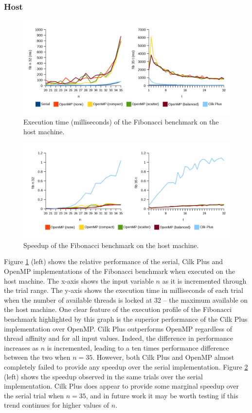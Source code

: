 \documentclass{report}
\begin{document}
\subsubsection{Host}
\noindent
\begin{figure}[b!]
	\includegraphics[width=\linewidth]{../../charts/intel64/fib_time}
	\caption{Execution time (milliseconds) of the Fibonacci benchmark on the host machine.}
	\label{Fig:fibhosttime}
\end{figure}
\noindent
\begin{figure}[h!]
	\includegraphics[width=\linewidth]{../../charts/intel64/fib_speedup}
	\caption{Speedup of the Fibonacci benchmark on the host machine.}
	\label{Fig:fibhostspeedup}
\end{figure}
Figure \ref{Fig:fibhosttime} (left) shows the relative performance of the serial, Cilk Plus and OpenMP implementations of the Fibonacci benchmark when executed on the host machine. The x-axis shows the input variable \(n\) as it is incremented through the trial range. The y-axis shows the execution time in milliseconds of each trial when the number of available threads is locked at 32 -- the maximum available on the host machine. One clear feature of the execution profile of the Fibonacci benchmark highlighted by this graph is the superior performance of the Cilk Plus implementation over OpenMP. Cilk Plus outperforms OpenMP regardless of thread affinity and for all input values. Indeed, the difference in performance increases as \(n\) is incremented, leading to a ten times performance difference between the two when \(n=35\). However, both Cilk Plus and OpenMP almost completely failed to provide any speedup over the serial implementation. Figure \ref{Fig:fibhostspeedup} (left) shows the speedup observed in the same trials over the serial implementation. Cilk Plus does appear to provide some marginal speedup over the serial trial when \(n=35\), and in future work it may be worth testing if this trend continues for higher values of \(n\).
\end{document}
